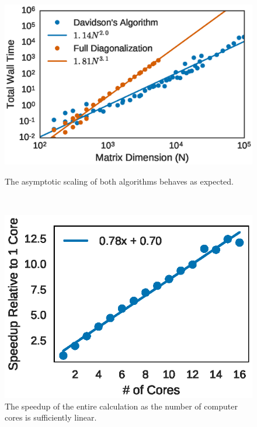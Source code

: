 \documentclass{revtex4}
\begin{document}
     
      \begin{figure}[t]
        \begin{minipage}[c]{0.45\linewidth}
          \includegraphics[height=0.7\linewidth]{../figures/dav_vs_exact_scaling.eps}
          \caption{The asymptotic scaling of both algorithms behaves as expected.}
          \label{fig:scaling}
        \end{minipage}
        ~
        \begin{minipage}[c]{0.45\linewidth}
          \includegraphics[height=0.7\linewidth]{../figures/parallel-scaling.eps}
          \caption{The speedup of the entire calculation as the number of computer cores is 
                          sufficiently linear.}
          \label{fig:parallel}
        \end{minipage}%
      \end{figure}
     
\end{document}

